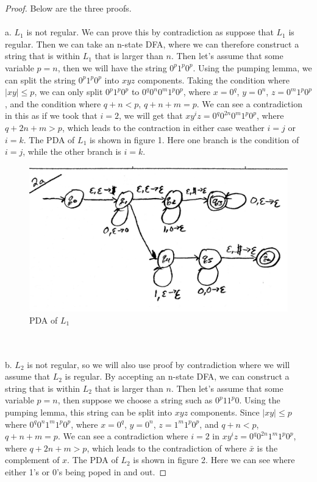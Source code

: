 \documentclass[12pt]{article}
\begin{document}
\begin{proof}
Below are the three proofs. \\ \\
a. $L_{1}$ is not regular. We can prove this by contradiction as suppose that $L_{1}$ is regular. Then we can take an n-state DFA, where we can therefore construct a string that is within $L_{1}$ that is larger than $n$. Then let's assume that some variable $p = n$, then we will have the string $0^{p}1^{p}0^{p}$. Using the pumping lemma, we can split the string $0^{p}1^{p}0^{p}$ into $xyz$ components. Taking the condition where $|xy| \leq p$, we can only split $0^{p}1^{p}0^{p}$ to $0^{q}0^{n}0^{m}1^{p}0^{p}$, where $x = 0^{q}$, $y = 0^{n}$, $z = 0^{m}1^{p}0^{p}$, and the condition where $q + n < p$, $q+n+m = p$. We can see a contradiction in this as if we took that $i = 2$, we will get that $xy^{i}z = 0^{q}0^{2n}0^{m}1^{p}0^{p}$, where $q + 2n + m > p$, which leads to the contraction in either case weather $i = j$ or $i = k$. The PDA of $L_{1}$ is shown in figure 1. Here one branch is the condition of $i = j$, while the other branch is $i = k$.
\begin{figure}
  \includegraphics[width=\linewidth]{2a.png}
  \caption{PDA of $L_{1}$}
\end{figure} \\ \\
b. $L_{2}$ is not regular, so we will also use proof by contradiction where we will assume that $L_{2}$ is regular. By accepting an n-state DFA, we can construct a string that is within $L_{2}$ that is larger than $n$. Then let's assume that some variable $p = n$, then suppose we choose a string such as $0^{p}11^{p}0$. Using the pumping lemma, this string can be split into $xyz$ components. Since $|xy| \leq p$ where $0^{q}0^{n}1^{m}1^{p}0^{p}$, where $x = 0^{q}$, $y = 0^{n}$, $z = 1^{m}1^{p}0^{p}$, and $q + n < p$, $q + n + m = p$. We can see a contradiction where $i = 2$ in $xy^{i}z = 0^{q}0^{2n}1^{m}1^{p}0^{p}$, where $q + 2n + m > p$, which leads to the contradiction of where $\bar{x}$ is the complement of $x$. The PDA of $L_{2}$ is shown in figure 2. Here we can see where either 1's or 0's being poped in and out. 

\end{proof}
\end{document}
